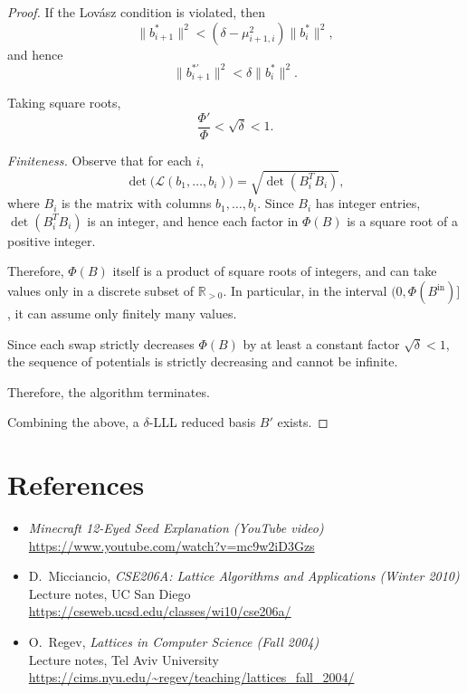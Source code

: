 \documentclass[11pt]{article}
\theoremstyle{plain}
\theoremstyle{definition}
\newcommand{\R}{\mathbb{R}}
\begin{document}
\begin{proof}
If the Lovász condition is violated, then
\[
  \|b_{i+1}^*\|^2 < (\delta - \mu_{i+1,i}^2)\|b_i^*\|^2,
\]
and hence
\[
  \|b_{i+1}^{*\prime}\|^2
  <
  \delta \|b_i^*\|^2.
\]

Taking square roots,
\[
  \frac{\Phi'}{\Phi}
  <
  \sqrt{\delta}
  <
  1.
\]

\medskip
\noindent\emph{Finiteness.}
Observe that for each $i$,
\[
  \det\!\big(\mathcal{L}(b_1,\dots,b_i)\big)
  =
  \sqrt{\det(B_i^T B_i)},
\]
where $B_i$ is the matrix with columns $b_1,\dots,b_i$. Since $B_i$ has
integer entries, $\det(B_i^T B_i)$ is an integer, and hence each factor in
$\Phi(B)$ is a square root of a positive integer.

Therefore, $\Phi(B)$ itself is a product of square roots of integers, and
can take values only in a discrete subset of $\R_{>0}$. In particular,
in the interval $(0, \Phi(B^{\text{in}})]$, it can assume only finitely
many values.

Since each swap strictly decreases $\Phi(B)$ by at least a constant factor
$\sqrt{\delta} < 1$, the sequence of potentials is strictly decreasing and
cannot be infinite.

\medskip
\noindent
Therefore, the algorithm terminates.

\medskip
Combining the above, a $\delta$-LLL reduced basis $B'$ exists.
\end{proof}

\section*{References}

\begin{itemize}
  \item \textit{Minecraft 12-Eyed Seed Explanation (YouTube video)}\\
        \url{https://www.youtube.com/watch?v=mc9w2iD3Gzs}

  \item D.\ Micciancio, \textit{CSE206A: Lattice Algorithms and Applications
        (Winter 2010)}\\
        Lecture notes, UC San Diego\\
        \url{https://cseweb.ucsd.edu/classes/wi10/cse206a/}

  \item O.\ Regev, \textit{Lattices in Computer Science (Fall 2004)}\\
        Lecture notes, Tel Aviv University\\
        \url{https://cims.nyu.edu/~regev/teaching/lattices_fall_2004/}
\end{itemize}
\newpage
\appendix
\end{document}
